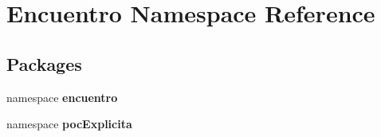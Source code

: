 \section{\-Encuentro \-Namespace \-Reference}
\label{namespace_encuentro}
\subsection*{\-Packages}
\begin{DoxyCompactItemize}
\item 
namespace {\bf encuentro}
\item 
namespace {\bf poc\-Explicita}
\end{DoxyCompactItemize}
